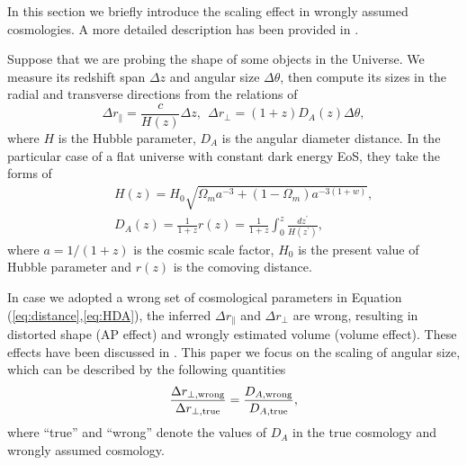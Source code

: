 \documentclass[iop]{emulateapj}
\begin{document}
In this section we briefly introduce the scaling effect in wrongly assumed cosmologies.
A more detailed description has been provided in \cite{Li2014,Li2015,Li2016}.

Suppose that we are probing the shape of some objects in the Universe.
We measure its redshift span $\Delta z$ and angular size $\Delta \theta$,
then compute its sizes in the radial and transverse directions from the relations of 
\begin{equation}\label{eq:distance}
\Delta r_{\parallel} = \frac{c}{H(z)}\Delta z,\ \ \Delta r_{\bot}=(1+z)D_A(z)\Delta \theta,
\end{equation}
where $H$ is the Hubble parameter, $D_A$ is the angular diameter distance.
In the particular case of a flat universe with constant dark energy EoS, they take the forms of
\begin{eqnarray}\label{eq:HDA}
& &H(z) = H_0\sqrt{\Omega_ma^{-3}+(1-\Omega_m)a^{-3(1+w)}},\nonumber\\
& &D_A(z) = \frac{1}{1+z}r(z)=\frac{1}{1+z}\int_0^z \frac{dz^\prime}{H(z^\prime)},
\end{eqnarray}
where $a=1/(1+z)$ is the cosmic scale factor,
$H_0$ is the present value of Hubble parameter and $r(z)$ is the comoving distance.

In case we adopted a wrong set of cosmological parameters in Equation (\ref{eq:distance},\ref{eq:HDA}),
the inferred $\Delta r_{\parallel}$ and $\Delta r_{\bot}$ are wrong,
resulting in distorted shape (AP effect) and wrongly estimated volume (volume effect).
These effects have been discussed in \cite{Li2014,Li2015,Li2016}.
This paper we focus on the scaling of angular size,
which can be described by the following quantities
\begin{equation}\label{eq:DA}
 \frac{\Delta r_{\bot, \rm wrong}}{\Delta r_{\bot, \rm true}}
 = \frac{D_{A, \rm wrong}}{D_{A, \rm true}},
\end{equation}
where ``true'' and ``wrong'' denote the values of $D_A$ in the true cosmology and wrongly assumed cosmology.
\end{document}
